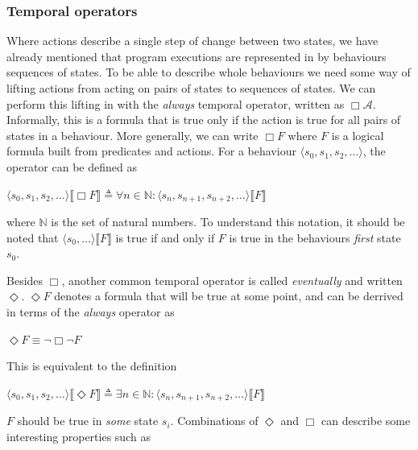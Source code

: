 \documentclass[english, biblatex, digitaloutput]{kththesis}
\begin{document}
\subsubsection{Temporal operators}

Where actions describe a single step of change between two states, we have already mentioned that program executions are represented in  by behaviours \ie sequences of states. To be able to describe whole behaviours we need some way of lifting actions from acting on pairs of states to sequences of states. We can perform this lifting in  with the \textit{always} temporal operator, written as $\Box \mathcal{A}$. Informally, this is a formula that is true only if the action is true for all pairs of states in a behaviour. More generally, we can write $\Box F$ where $F$ is a logical formula built from predicates and actions. For a behaviour $\langle s_0, s_1, s_2, \dotsc \rangle$, the operator can be defined as

\begin{math}
	\langle s_0, s_1, s_2, \dotsc \rangle \llbracket \Box F \rrbracket \triangleq \forall n \in \mathbb{N} : \langle s_n, s_{n+1}, s_{n+2}, \dotsc \rangle \llbracket F \rrbracket
\end{math}

where $\mathbb{N}$ is the set of natural numbers. To understand this notation, it should be noted that $\langle s_0, \dotsc \rangle \llbracket F \rrbracket$ is true if and only if $F$ is true in the behaviours \textit{first} state $s_0$.

Besides $\Box$, another common temporal operator is called \textit{eventually} and written $\Diamond$. $\Diamond F$ denotes a formula that will be true at some point, and can be derrived in terms of the \textit{always} operator as

\begin{math}
	\Diamond F \equiv \neg \Box \neg F
\end{math}

This is equivalent to the definition

\begin{math}
	\langle s_0, s_1, s_2, \dotsc \rangle \llbracket \Diamond F \rrbracket \triangleq \exists n \in \mathbb{N} : \langle s_n, s_{n+1}, s_{n+2}, \dotsc \rangle \llbracket F \rrbracket
\end{math}

\ie $F$ should be true in \textit{some} state $s_i$. Combinations of $\Diamond$ and $\Box$ can describe some interesting properties such as
\end{document}
